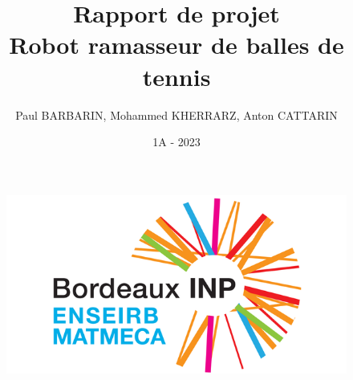 \documentclass[12pt]{article}
\title{Rapport de projet \\ \textbf{Robot ramasseur de balles de tennis}}
\author{Paul BARBARIN, Mohammed KHERRARZ, Anton CATTARIN}
\date{1A - 2023}
\begin{document}
    \begin{titlepage}
        
        \begin{figure}
            \centering
            \includegraphics{img/enseirb}
        \end{figure}
        \maketitle

    \end{titlepage}
\end{document}

